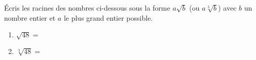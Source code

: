 \medskip

Écris les racines des nombres ci-dessous sous la forme $a\sqrt{b}$ (ou $a\sqrt[3]{b}$) avec $b$ un nombre entier et $a$ le plus grand entier possible.

\begin{enumerate}
\setlength\itemsep{1em}
\item $\sqrt{48}=$
\item $\sqrt[3]{48}=$
\end{enumerate}